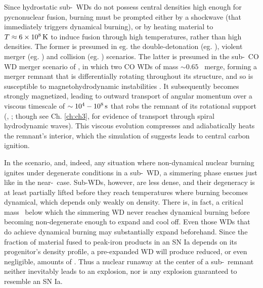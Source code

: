Since hydrostatic sub-\Mch\ WDs do not possess central densities high enough for pycnonuclear fusion, burning must be prompted either by a shockwave (that immediately triggers dynamical burning), or by heating material to $T\approx6\times10^8\,\mathrm{K}$ to induce fusion through high temperatures, rather than high densities.  The former is presumed in eg. the double-detonation (eg. \citealt{fink+07, woosk11}), violent merger (eg. \citealt{pakm+10}) and collision (eg. \citealt{loreig10}) scenarios.  The latter is presumed in the sub-\Mch\ CO WD merger scenario of \citeal{vkercj10}, in which two CO WDs of mass $\sim0.65$ \Msun\ merge, forming a merger remnant that is differentially rotating throughout its structure, and so is susceptible to magnetohydrodynamic instabilities \citep{shen+12, ji+13}.  It subsequently becomes strongly magnetized, leading to outward transport of angular momentum over a viscous timescale of $\sim10^4 - 10^8\,\mathrm{s}$ that robs the remnant of its rotational support (\citeal{vkercj10}, \citealt{shen+12}; though see Ch. \ref{ch:ch3}, \citealt{kash+15} for evidence of transport through spiral hydrodynamic waves).  This viscous evolution compresses and adiabatically heats the remnant's interior, which the simulation of \cite{ji+13} suggests leads to central carbon ignition.

In the \citeal{vkercj10} scenario, and, indeed, any situation where non-dynamical nuclear burning ignites under degenerate conditions in a sub-\Mch\ WD, a simmering phase ensues just like in the near-\Mch\ case.  Sub-\Mch WDs, however, are less dense, and their degeneracy is at least partially lifted before they reach temperatures where burning becomes dynamical, which depends only weakly on density.  There is, in fact, a critical mass \Mcrit\ below which the simmering WD never reaches dynamical burning before becoming non-degenerate enough to expand and cool off.  Even those WDs that do achieve dynamical burning may substantially expand beforehand.  Since the fraction of material fused to peak-iron products in an SN Ia depends on its progenitor's density profile, a pre-expanded WD will produce reduced, or even negligible, amounts of \Ni.  Thus a nuclear runaway at the center of a sub-\Mch\ remnant neither inevitably leads to an explosion, nor is any explosion guaranteed to resemble an SN Ia.

